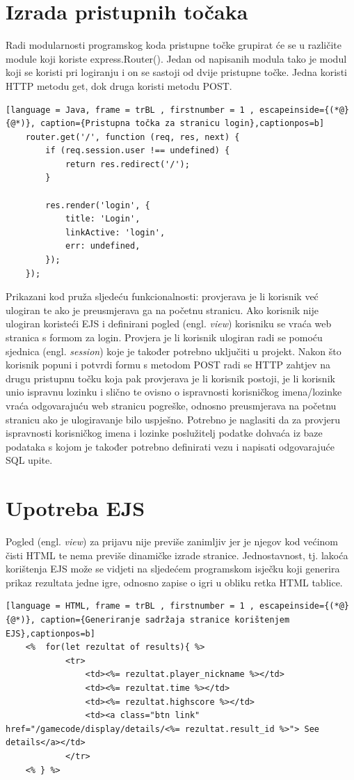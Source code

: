 \documentclass[times, utf8, zavrsni, numeric]{fer}
\begin{document}
	\section{Izrada pristupnih točaka}
	Radi modularnosti programskog koda  pristupne točke grupirat će se u različite module koji koriste express.Router(). Jedan od napisanih modula tako je modul koji se koristi pri logiranju i on se sastoji od dvije pristupne točke. 
	Jedna koristi HTTP metodu get, dok druga koristi metodu POST.
	\renewcommand{\lstlistingname}{Kôd}
	\begin{lstlisting}[language = Java, frame = trBL , firstnumber = 1 , escapeinside={(*@}{@*)}, caption={Pristupna točka za stranicu login},captionpos=b]
	router.get('/', function (req, res, next) {
		if (req.session.user !== undefined) {
			return res.redirect('/');
		}

		res.render('login', {
			title: 'Login',
			linkActive: 'login',
			err: undefined,
		});
	});
	\end{lstlisting}
	
	Prikazani kod pruža sljedeću funkcionalnosti: provjerava je li korisnik već ulogiran te ako je preusmjerava ga na početnu stranicu. Ako korisnik nije ulogiran koristeći EJS i definirani pogled (engl. \textit{view}) korisniku se vraća
	web stranica s formom za login. Provjera je li korisnik ulogiran radi se pomoću sjednica (engl. \textit{session}) koje je također potrebno uključiti u projekt. Nakon što korisnik popuni i potvrdi formu s metodom POST radi se HTTP zahtjev 
	na drugu pristupnu točku koja pak provjerava je li korisnik postoji, je li korisnik unio ispravnu lozinku i slično te ovisno o ispravnosti korisničkog imena/lozinke vraća odgovarajuću web stranicu pogreške, odnosno preusmjerava na početnu stranicu
	ako je ulogiravanje bilo uspješno. Potrebno je naglasiti da za provjeru ispravnosti korisničkog imena i lozinke poslužitelj  podatke dohvaća iz baze podataka s kojom je također potrebno definirati vezu i napisati odgovarajuće SQL
	upite. 
	

	\section{Upotreba EJS}
	Pogled (engl. \textit{view}) za prijavu nije previše zanimljiv jer je njegov kod većinom čisti HTML te nema previše dinamičke izrade stranice. Jednostavnost, tj. lakoća korištenja EJS može se vidjeti na sljedećem programskom isječku koji 
	generira prikaz rezultata jedne igre, odnosno zapise o igri u obliku retka HTML tablice.
	\renewcommand{\lstlistingname}{Kôd}
	\begin{lstlisting}[language = HTML, frame = trBL , firstnumber = 1 , escapeinside={(*@}{@*)}, caption={Generiranje sadržaja stranice korištenjem EJS},captionpos=b]
	<% 	for(let rezultat of results){ %>
			<tr>
				<td><%= rezultat.player_nickname %></td>
				<td><%= rezultat.time %></td>
				<td><%= rezultat.highscore %></td>
				<td><a class="btn link" href="/gamecode/display/details/<%= rezultat.result_id %>"> See details</a></td>
            </tr>
	<% } %>
	\end{lstlisting}
	
\end{document}
